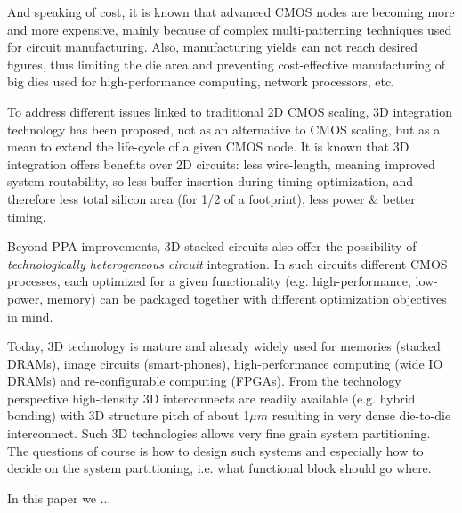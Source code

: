 \documentclass[conference]{IEEEtran}
\begin{document}
And speaking of cost, it is known that advanced CMOS nodes are becoming more and more expensive, mainly because of complex multi-patterning techniques used for circuit manufacturing. Also, manufacturing yields can not reach desired figures, thus limiting the die area and preventing cost-effective manufacturing of big dies used for high-performance computing, network processors, etc. 

To address different issues linked to traditional 2D CMOS scaling, 3D integration technology has been proposed, not as an alternative to CMOS scaling, but as a mean to extend the life-cycle of a given CMOS node. It is known that 3D integration offers benefits over 2D circuits: less wire-length, meaning improved system routability, so less buffer insertion during timing optimization, and therefore less total silicon area (for 1/2 of a footprint), less power \& better timing. 

Beyond PPA improvements, 3D stacked circuits also offer the possibility of \emph{technologically heterogeneous circuit} integration. In such circuits different CMOS processes, each optimized for a given functionality (e.g. high-performance, low-power, memory) can be packaged together with different optimization objectives in mind. 

Today, 3D technology is mature and already widely used for memories (stacked DRAMs), image circuits (smart-phones), high-performance computing (wide IO DRAMs) and re-configurable computing (FPGAs). From the technology perspective high-density 3D interconnects are readily available (e.g. hybrid bonding) with 3D structure pitch of about 1$\mu m$ resulting in very dense die-to-die interconnect. Such 3D technologies allows very fine grain system partitioning. The questions of course is how to design such systems and especially how to decide on the system partitioning, i.e. what functional block should go where. 

In this paper we ... 

\end{document}
